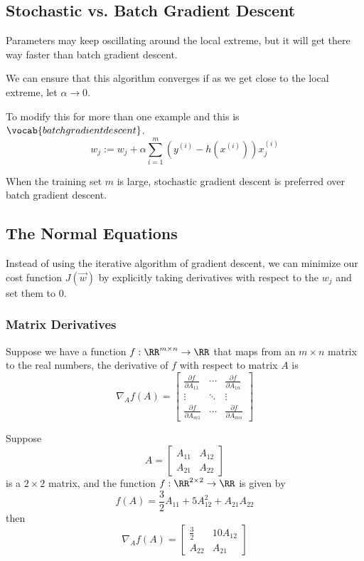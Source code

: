 \documentclass[12pt]{scrartcl}
\begin{document}
\subsection{Stochastic vs. Batch Gradient Descent}
\begin{note}
    Parameters may keep oscillating around the local extreme, but it will get there way faster than batch gradient descent.
\end{note}
\begin{note}
    We can ensure that this algorithm converges if as we get close to the local extreme, let $\alpha \to 0$.
\end{note}
\begin{definition}
    To modify this for more than one example and this is \\ $\vocab{batch gradient descent}$.
\[w_j:= w_j + \alpha \sum_{i=1}^m(y^{(i)} - h(x^{(i)}))x_j^{(i)}\]
\end{definition}
\begin{note}
    When the training set $m$ is large, stochastic gradient descent is preferred over batch gradient descent.
\end{note}
\subsection{The Normal Equations}
Instead of using the iterative algorithm of gradient descent, we can minimize our cost function $J(\vec{w})$ by explicitly taking derivatives with respect to the $w_j$ and set them to 0.
\subsubsection{Matrix Derivatives}
Suppose we have a function $f: \RR^{m \times n} \to \RR$ that maps from an $m \times n$ matrix to the real numbers, the derivative of $f$ with respect to matrix $A$ is 
$$\nabla_A f(A) = \begin{bmatrix}
    \frac{\partial f}{\partial A_{11}} & \cdots & \frac{\partial f}{\partial A_{1n}}\\
    \vdots & \ddots & \vdots\\
    \frac{\partial f}{\partial A_{m1}} & \cdots & \frac{\partial f}{\partial A_{mn}}
\end{bmatrix}$$
\begin{example}
    Suppose $$A = \begin{bmatrix}
        A_{11} & A_{12}\\
        A_{21} & A_{22}
    \end{bmatrix}$$ is a $2 \times 2$ matrix, and the function $f: \RR ^{2 \times 2} \to \RR$ is given by 
    \[f(A) = \frac{3}{2}A_{11} + 5A_{12}^2 + A_{21}A_{22}\]
    then 
$$\nabla_A f(A) = \begin{bmatrix}
    \frac{3}{2} & 10A_{12}\\
    A_{22} & A_{21}
\end{bmatrix}$$
\end{example}
\end{document}
